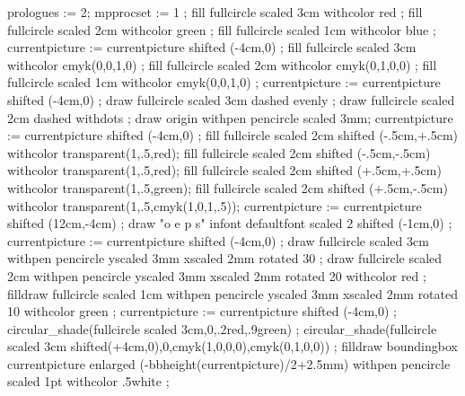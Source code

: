 
\unprotect

%

    prologues := 2;
    mpprocset := 1 ;
    fill fullcircle scaled 3cm withcolor red ;
    fill fullcircle scaled 2cm withcolor green ;
    fill fullcircle scaled 1cm withcolor blue ;
    currentpicture := currentpicture shifted (-4cm,0) ;
    fill fullcircle scaled 3cm withcolor cmyk(0,0,1,0) ;
    fill fullcircle scaled 2cm withcolor cmyk(0,1,0,0) ;
    fill fullcircle scaled 1cm withcolor cmyk(0,0,1,0) ;
    currentpicture := currentpicture shifted (-4cm,0) ;
    draw fullcircle scaled 3cm dashed evenly ;
    draw fullcircle scaled 2cm dashed withdots  ;
    draw origin withpen pencircle scaled 3mm;
    currentpicture := currentpicture shifted (-4cm,0) ;
    fill fullcircle scaled 2cm shifted (-.5cm,+.5cm) withcolor transparent(1,.5,red);
    fill fullcircle scaled 2cm shifted (-.5cm,-.5cm) withcolor transparent(1,.5,red);
    fill fullcircle scaled 2cm shifted (+.5cm,+.5cm) withcolor transparent(1,.5,green);
    fill fullcircle scaled 2cm shifted (+.5cm,-.5cm) withcolor transparent(1,.5,cmyk(1,0,1,.5));
    currentpicture := currentpicture shifted (12cm,-4cm) ;
    draw "o e p s" infont defaultfont scaled 2 shifted (-1cm,0) ;
    currentpicture := currentpicture shifted (-4cm,0) ;
    draw fullcircle scaled 3cm withpen pencircle yscaled 3mm xscaled 2mm rotated 30  ;
    draw fullcircle scaled 2cm withpen pencircle yscaled 3mm xscaled 2mm rotated 20 withcolor red ;
    filldraw fullcircle scaled 1cm withpen pencircle yscaled 3mm xscaled 2mm rotated 10 withcolor green ;
    currentpicture := currentpicture shifted (-4cm,0) ;
    circular_shade(fullcircle scaled 3cm,0,.2red,.9green) ;
    circular_shade(fullcircle scaled 3cm shifted(+4cm,0),0,cmyk(1,0,0,0),cmyk(0,1,0,0)) ;
    filldraw boundingbox currentpicture enlarged (-bbheight(currentpicture)/2+2.5mm) withpen pencircle scaled 1pt withcolor .5white ;
\stopuseMPgraphic

\protect \endinput
